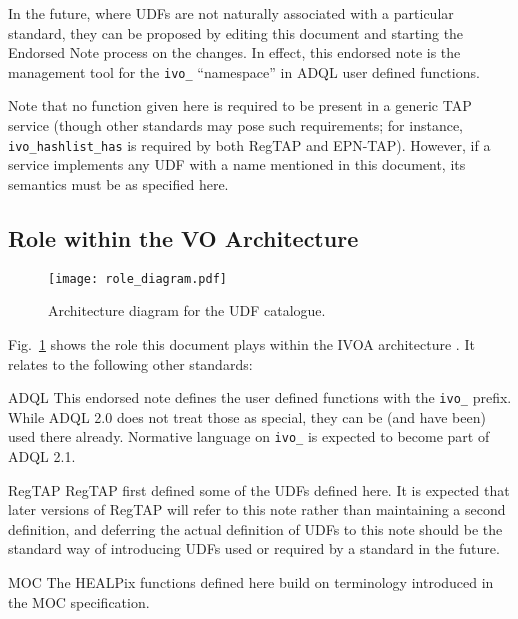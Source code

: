 \documentclass[11pt,a4paper]{ivoa}
\begin{document}
In the future, where UDFs are not naturally associated with a
particular standard, they can be proposed by editing this document and
starting the Endorsed Note process \citep{2017ivoa.spec.0517G} on the
changes.  In effect, this endorsed note is the management tool for
the \verb|ivo_| ``namespace'' in ADQL user defined functions.

Note that no function given here is required to be present in a generic
TAP service (though other standards may pose such requirements; for
instance,
\verb|ivo_hashlist_has| is required by both
RegTAP and EPN-TAP).  However, if a service implements any UDF with a
name mentioned in this document, its semantics must be as specified here.

\subsection{Role within the VO Architecture}

\begin{figure}
\centering

\texttt{[image: role\_diagram.pdf]}
\caption{Architecture diagram for the UDF catalogue.}
\label{fig:archdiag}
\end{figure}

Fig.~\ref{fig:archdiag} shows the role this document plays within the
IVOA architecture \citep{2021ivoa.spec.1101D}.  It relates to the following
other standards:

\begin{bigdescription}
\item[ADQL \citep{2023ivoa.spec.1215M}] This endorsed note defines the
user defined functions with the \verb|ivo_| prefix.  While ADQL 2.0
does not treat those as special, they can be (and have been) used there
already.  Normative language on \verb|ivo_| is expected to become
part of ADQL 2.1.

\item[RegTAP \citep{2019ivoa.spec.1011D}] RegTAP first defined some of the
UDFs defined here.  It is expected that later versions of RegTAP will
refer to this note rather than maintaining a second definition, and
deferring the actual definition of UDFs to this note should be the
standard way of introducing UDFs used or required by a standard in the future.

\item[MOC \citep{2022ivoa.spec.0727F}] The HEALPix functions defined
here build on terminology introduced in the MOC specification.
\end{bigdescription}
\end{document}
